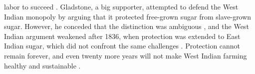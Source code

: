 labor to succeed . Gladstone, a big supporter, attempted to defend the West Indian monopoly by arguing that it protected free-grown sugar from slave-grown sugar. However, he conceded that the distinction was ambiguous , and the West Indian argument weakened after 1836, when protection was extended to East Indian sugar, which did not confront the same challenges . Protection cannot remain forever, and even twenty more years will not make West Indian farming healthy and sustainable .
